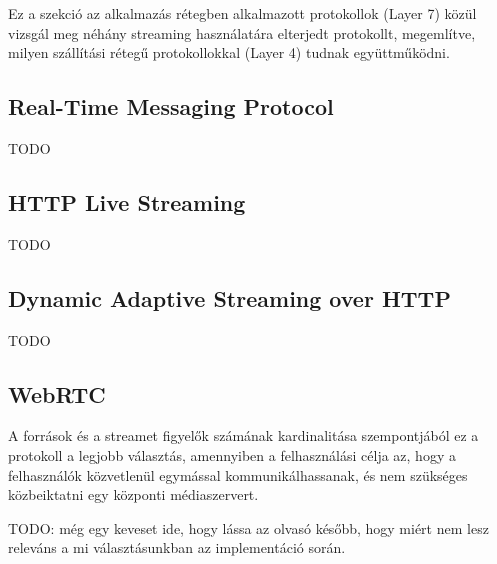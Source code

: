 Ez a szekció az alkalmazás rétegben alkalmazott protokollok (Layer 7) közül vizsgál meg néhány streaming használatára elterjedt protokollt, megemlítve, milyen szállítási rétegű protokollokkal (Layer 4) tudnak együttműködni.

\subsection{Real-Time Messaging Protocol}

TODO

\subsection{HTTP Live Streaming}

TODO

\subsection{Dynamic Adaptive Streaming over HTTP}

TODO

\subsection{WebRTC}

A források és a streamet figyelők számának kardinalitása szempontjából ez a protokoll a legjobb választás, amennyiben a felhasználási célja az, hogy a felhasználók közvetlenül egymással kommunikálhassanak, és nem szükséges közbeiktatni egy központi médiaszervert. 

TODO: még egy keveset ide, hogy lássa az olvasó később, hogy miért nem lesz releváns a mi választásunkban az implementáció során.
